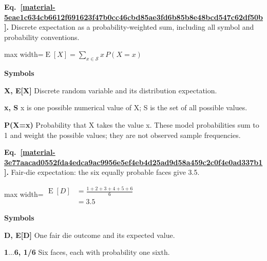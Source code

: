 \documentclass[11pt,a4paper]{article}
\begin{document}
\par\medskip
\noindent\begin{minipage}{\linewidth}
\label{material-5eae1c634cb6612f691623f47b0cc46cbd85ae3fd6b85b8e48bcd547c62df50b}
\noindent\textbf{Eq.~\ref*{material-5eae1c634cb6612f691623f47b0cc46cbd85ae3fd6b85b8e48bcd547c62df50b}.} Discrete expectation as a probability-weighted sum, including all symbol and probability conventions.\par\nopagebreak
\begin{center}\begin{adjustbox}{max width=\linewidth}$\displaystyle \operatorname{E}[X] = \sum_{x \in \mathcal{S}} x\,P(X=x)$\end{adjustbox}\end{center}

\par\noindent\textbf{Symbols}

\par\noindent\textbf{X, E[X]} Discrete random variable and its distribution expectation.

\par\noindent\textbf{x, S} x is one possible numerical value of X; S is the set of all possible values.

\par\noindent\textbf{P(X=x)} Probability that X takes the value x. These model probabilities sum to 1 and weight the possible values; they are not observed sample frequencies.

\end{minipage}\par
\medskip

\par\medskip
\noindent\begin{minipage}{\linewidth}
\label{material-3e77aacad0552fda4edca9ac9956e5ef4eb4d25ad9d58a459c2c0f4e0ad337b1}
\noindent\textbf{Eq.~\ref*{material-3e77aacad0552fda4edca9ac9956e5ef4eb4d25ad9d58a459c2c0f4e0ad337b1}.} Fair-die expectation: the six equally probable faces give 3.5.\par\nopagebreak
\begin{center}\begin{adjustbox}{max width=\linewidth}$\displaystyle \begin{aligned}\operatorname{E}[D]&=\frac{1+2+3+4+5+6}{6}\\&=3.5\end{aligned}$\end{adjustbox}\end{center}

\par\noindent\textbf{Symbols}

\par\noindent\textbf{D, E[D]} One fair die outcome and its expected value.

\par\noindent\textbf{1\ensuremath{\ldots}6, 1/6} Six faces, each with probability one sixth.

\end{minipage}\par
\medskip
\end{document}
